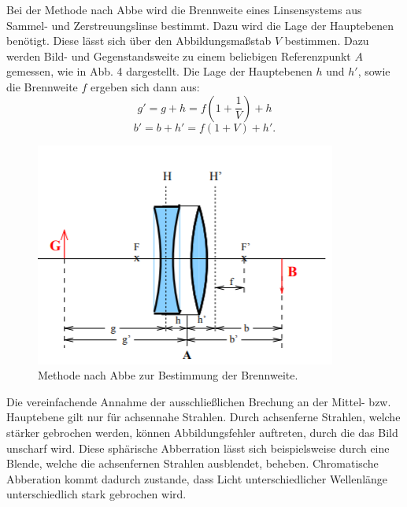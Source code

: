 \noindent Bei der Methode nach Abbe wird die Brennweite eines Linsensystems aus
Sammel- und Zerstreuungslinse bestimmt. Dazu wird die Lage der Hauptebenen
benötigt. Diese lässt sich über den Abbildungsmaßstab $V$ bestimmen. Dazu
werden Bild- und Gegenstandsweite zu einem beliebigen Referenzpunkt $A$
gemessen, wie in Abb. 4 dargestellt. Die Lage der Hauptebenen $h$ und
$h'$, sowie die Brennweite $f$ ergeben sich dann aus:
\begin{equation}
\label{eq:abbe1}
g' = g+h = f\left(1+ \frac{1}{V}\right) + h
\end{equation}
\begin{equation}
\label{eq:abbe2}
b' = b+h' = f \left(1+ V \right)+h'.
\end{equation}

\begin{figure}[H]
\label{fig:abbe}
\center
\includegraphics[scale=1]{abbe.png}
\caption{Methode nach Abbe zur Bestimmung der Brennweite. \cite[S.5]{kent}}
\end{figure}

\noindent Die vereinfachende Annahme der ausschließlichen Brechung an der Mittel-
bzw. Hauptebene gilt nur für achsennahe Strahlen. Durch achsenferne
Strahlen, welche stärker gebrochen werden, können Abbildungsfehler
auftreten, durch die das Bild unscharf wird. Diese sphärische Abberration lässt sich
beispielsweise durch eine Blende, welche die achsenfernen Strahlen
ausblendet, beheben.
Chromatische Abberation kommt dadurch zustande, dass Licht
unterschiedlicher Wellenlänge unterschiedlich stark gebrochen wird.
